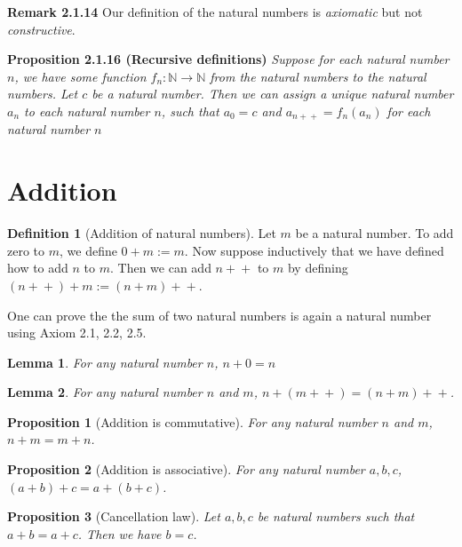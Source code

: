 \documentclass[
]{book}
\newtheorem{lemma}{Lemma}[chapter]
\newtheorem{proposition}{Proposition}[chapter]
\theoremstyle{definition}
\newtheorem{definition}{Definition}[chapter]
\theoremstyle{definition}
\theoremstyle{definition}
\theoremstyle{definition}
\theoremstyle{remark}
\begin{document}
\textbf{Remark 2.1.14} Our definition of the natural numbers is \emph{axiomatic} but not \emph{constructive}.

\textbf{Proposition 2.1.16 (Recursive definitions)} \emph{Suppose for each natural number \(n\), we have some function \(f_n:\mathbb{N} \to \mathbb{N}\) from the natural numbers to the natural numbers. Let \(c\) be a natural number. Then we can assign a unique natural number \(a_n\) to each natural number \(n\), such that \(a_0 = c\) and \(a_{n+\!+} = f_n(a_n)\) for each natural number \(n\)}

\section{Addition}\label{addition}

\begin{definition}[Addition of natural numbers]
\protect\hypertarget{def:addition}{}\label{def:addition}Let \(m\) be a natural number. To add zero to \(m\), we define \(0+m:= m\). Now suppose inductively that we have defined how to add \(n\) to \(m\). Then we can add \(n+\!\!+\) to \(m\) by defining \((n+\!\!+) + m := (n+m)+\!\!+\).
\end{definition}

One can prove the the sum of two natural numbers is again a natural number using Axiom 2.1, 2.2, 2.5.

\begin{lemma}
For any natural number \(n\), \(n+0 = n\)
\end{lemma}

\begin{lemma}
For any natural number \(n\) and \(m\), \(n+(m+\!\!+) =(n+m)+\!\!+\).
\end{lemma}

\begin{proposition}[Addition is commutative]
\protect\hypertarget{prp:addcommutative}{}\label{prp:addcommutative}For any natural number \(n\) and \(m\), \(n+m = m+n\).
\end{proposition}

\begin{proposition}[Addition is associative]
\protect\hypertarget{prp:addassociative}{}\label{prp:addassociative}For any natural number \(a,b,c\), \((a+b)+c = a+(b+c)\).
\end{proposition}

\begin{proposition}[Cancellation law]
\protect\hypertarget{prp:cancel}{}\label{prp:cancel}Let \(a,b,c\) be natural numbers such that \(a+b=a+c\). Then we have \(b=c\).
\end{proposition}
\end{document}
